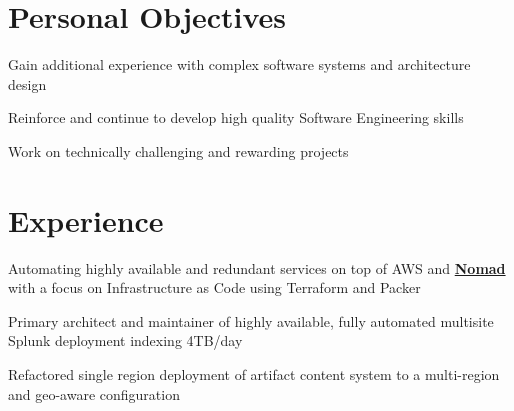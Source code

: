 \documentclass[letterpaper]{deedy-resume} %
\begin{document}
%
%
\begin{minipage}[t]{0.66\textwidth} %


\section{Personal Objectives}
\vspace{\topsep} %
\begin{tightitemize}
\item Gain additional experience with complex software systems and architecture design
\item Reinforce and continue to develop high quality Software Engineering skills
\item Work on technically challenging and rewarding projects
\end{tightitemize}


\section{Experience}


\begin{tightitemize}
\item Automating highly available and redundant services on top of AWS and \href{https://www.nomadproject.io}{\bf Nomad} with a focus on Infrastructure as Code using Terraform and Packer
\item Primary architect and maintainer of highly available, fully automated multisite Splunk deployment indexing 4TB/day
\item Refactored single region deployment of artifact content system to a multi-region and geo-aware configuration
\end{tightitemize}


\end{minipage}
\end{document}

